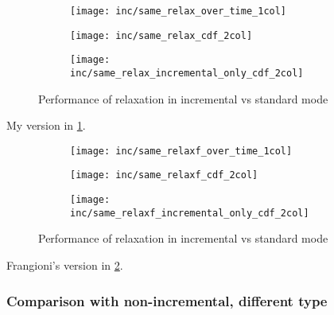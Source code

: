 \begin{figure}
    \begin{widepage} 
    \begin{subfigure}[c]{\textwidth}
        \texttt{[image: inc/same\_relax\_over\_time\_1col]}
    \end{subfigure}
    \begin{subfigure}[c]{0.5\textwidth}
        \texttt{[image: inc/same\_relax\_cdf\_2col]}
    \end{subfigure}
    \begin{subfigure}[c]{0.5\textwidth}
        \texttt{[image: inc/same\_relax\_incremental\_only\_cdf\_2col]}
    \end{subfigure}
    \end{widepage}
    \caption{Performance of relaxation in incremental vs standard mode}
    \label{fig:inc-same-relax}
\end{figure}

My version in \cref{fig:inc-same-relax}.

\begin{figure}
    \begin{widepage} 
    \begin{subfigure}[c]{\textwidth}
        \texttt{[image: inc/same\_relaxf\_over\_time\_1col]}
    \end{subfigure}
    \begin{subfigure}[c]{0.5\textwidth}
        \texttt{[image: inc/same\_relaxf\_cdf\_2col]}
    \end{subfigure}
    \begin{subfigure}[c]{0.5\textwidth}
        \texttt{[image: inc/same\_relaxf\_incremental\_only\_cdf\_2col]}
    \end{subfigure}
    \end{widepage}
    \caption{Performance of relaxation in incremental vs standard mode}
    \label{fig:inc-same-relaxf}
\end{figure}

Frangioni's version in \cref{fig:inc-same-relaxf}. 

\subsubsection{Comparison with non-incremental, different type}

